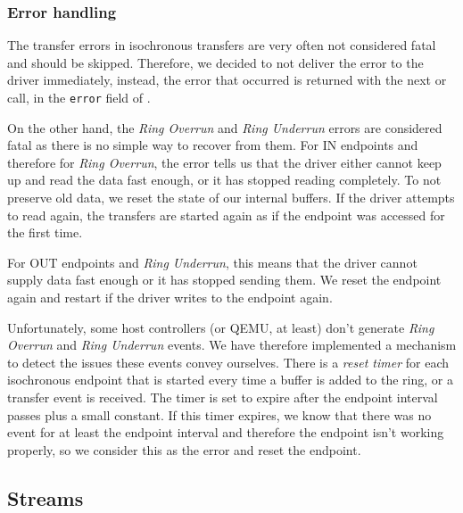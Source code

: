 \subsubsection{Error handling}

The transfer errors in isochronous transfers are very often not considered fatal
and should be skipped. Therefore, we decided to not deliver the
error to the driver immediately, instead, the error that occurred is returned with
the next  or  call, in the \texttt{error} field of
.

On the other hand, the \textit{Ring Overrun} and \textit{Ring Underrun} errors
are considered fatal as there is no simple way to recover from them. For IN
endpoints and therefore for \textit{Ring Overrun}, the error tells us that the
driver either cannot keep up and read the data fast enough, or it has stopped
reading completely. To not preserve old data, we reset the state of our
internal buffers. If the driver attempts to read again, the transfers are
started again as if the endpoint was accessed for the first time.

For OUT endpoints and \textit{Ring Underrun}, this means that the driver cannot
supply data fast enough or it has stopped sending them. We reset the endpoint
again and restart if the driver writes to the endpoint again.

Unfortunately, some host controllers (or QEMU, at least) don't generate
\textit{Ring Overrun} and \textit{Ring Underrun} events. We have therefore
implemented a mechanism to detect the issues these events convey ourselves.
There is a \textit{reset timer} for each isochronous endpoint that is started
every time a buffer is added to the ring, or a transfer event is received. The
timer is set to expire after the endpoint interval passes plus a small
constant. If this timer expires, we know that there was no event for at least
the endpoint interval and therefore the endpoint isn't working properly, so we
consider this as the error and reset the endpoint.

\subsection{Streams}

